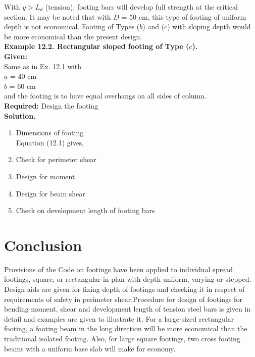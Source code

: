 \documentclass{book}
\begin{document}
With $y > L_d$ (tension), footing bars will develop full strength at the critical section. It may be noted that with $D$ = 50 cm, this type of footing of uniform depth is not economical. Footing of Types ($b$) and ($c$) with sloping depth would be more economical than the present design.\\

\textbf{ Example 12.2. Rectangular sloped footing of Type ($c$).}\\
\textbf{Given:}\\
Same as in Ex. 12.1 with\\
$a$ = 40 cm\\
$b$ = 60 cm\\ 
and the footing is to have equal overhangs on all sides of column.\\
\textbf{Required:} Design the footing\\
\textbf{Solution.}
\begin{enumerate}
\item  Dimensions of footing\\
Equation (12.1) gives,
\item Check for perimeter shear
\item Design for moment
\item Design for beam shear
\item Check on development length of footing bars
\end{enumerate}
\section{Conclusion}
Provisions of the Code on footings have been applied to individual spread footings, square, or rectangular in plan with depth uniform, varying or stepped. Design aids are given for ﬁxing depth of footings and checking it in respect of requirements of safety in perimeter shear.Procedure for design of footings for bending moment, shear and development length of tension steel bars is given in detail and examples are given to illustrate it. For a large-sized rectangular footing, a footing beam in the long direction will be more economical than the traditional isolated footing. Also, for large square footings, two cross footing beams with a uniform base slab will make for economy.
\end{document}
